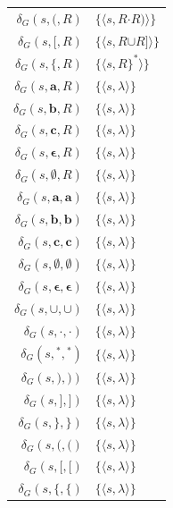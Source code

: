 \begin{center}\begin{tabular}{r@{ = }l}
$\delta_G(s,\pmb{(},R)$ & $\{\langle s,R\pmb{\cdot}R\pmb{)}\rangle\}$ \\
$\delta_G(s,\pmb{[},R)$ & $\{\langle s,R\pmb{\cup}R\pmb{]}\rangle\}$ \\
$\delta_G(s,\pmb{\{},R)$ & $\{\langle s,R\pmb{\}^*}\rangle\}$ \\
$\delta_G(s,\pmb{a},R)$ & $\{\langle s,\lambda\rangle\}$ \\
$\delta_G(s,\pmb{b},R)$ & $\{\langle s,\lambda\rangle\}$ \\
$\delta_G(s,\pmb{c},R)$ & $\{\langle s,\lambda\rangle\}$ \\
$\delta_G(s,\pmb{\epsilon},R)$ & $\{\langle s,\lambda\rangle\}$ \\
$\delta_G(s,\pmb{\emptyset}, R)$ & $\{\langle s,\lambda\rangle\}$ \\
$\delta_G(s,\pmb{a},\pmb{a})$ & $\{\langle s,\lambda\rangle\}$ \\
$\delta_G(s,\pmb{b},\pmb{b})$ & $\{\langle s,\lambda\rangle\}$ \\
$\delta_G(s,\pmb{c},\pmb{c})$ & $\{\langle s,\lambda\rangle\}$ \\
$\delta_G(s,\pmb{\emptyset},\pmb{\emptyset})$ & $\{\langle s,\lambda\rangle\}$ \\
$\delta_G(s,\pmb{\epsilon},\pmb{\epsilon})$ & $\{\langle s,\lambda\rangle\}$ \\
$\delta_G(s,\pmb{\cup},\pmb{\cup})$ & $\{\langle s,\lambda\rangle\}$ \\
$\delta_G(s,\pmb{\cdot},\pmb{\cdot})$ & $\{\langle s,\lambda\rangle\}$ \\
$\delta_G(s,\pmb{^*},\pmb{^*})$ & $\{\langle s,\lambda\rangle\}$ \\
$\delta_G(s,\pmb{)},\pmb{)})$ & $\{\langle s,\lambda\rangle\}$ \\
$\delta_G(s,\pmb{]},\pmb{]})$ & $\{\langle s,\lambda\rangle\}$ \\
$\delta_G(s,\pmb{\}},\pmb{\}})$ & $\{\langle s,\lambda\rangle\}$ \\
$\delta_G(s,\pmb{(},\pmb{(})$ & $\{\langle s,\lambda\rangle\}$ \\
$\delta_G(s,\pmb{[},\pmb{[})$ & $\{\langle s,\lambda\rangle\}$ \\
$\delta_G(s,\pmb{\{},\pmb{\{})$ & $\{\langle s,\lambda\rangle\}$
\end{tabular}\end{center}


